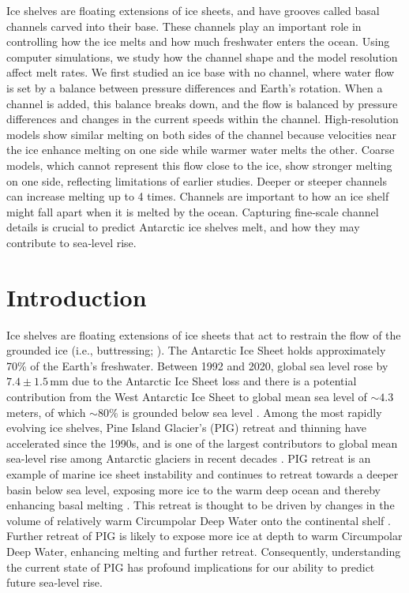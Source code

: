 \documentclass[draft]{agujournal2019}
\begin{document}
Ice shelves are floating extensions of ice sheets, and have grooves called basal channels carved into their base. These channels play an important role in controlling how the ice melts and how much freshwater enters the ocean. Using computer simulations, we study how the channel shape and the model resolution affect melt rates. We first studied an ice base with no channel, where water flow is set by a balance between pressure differences and Earth’s rotation. When a channel is added, this balance breaks down, and the flow is balanced by pressure differences and changes in the current speeds within the channel. High‑resolution models show similar melting on both sides of the channel because velocities near the ice enhance melting on one side while warmer water melts the other. Coarse models, which cannot represent this flow close to the ice, show stronger melting on one side, reflecting limitations of earlier studies. Deeper or steeper channels can increase melting up to 4 times. Channels are important to how an ice shelf might fall apart when it is melted by the ocean. Capturing fine‑scale channel details is crucial to predict  Antarctic ice shelves melt, and how they may contribute to sea‑level rise.


\section{Introduction}

Ice shelves are floating extensions of ice sheets that act to restrain the flow of the grounded ice (i.e., buttressing; \citealt{Dupont_iceshelf_2005}). The Antarctic Ice Sheet holds approximately 70\% of the Earth's freshwater. Between 1992 and 2020, global sea level rose by $7.4\pm1.5\,\mathrm{mm}$ due to the Antarctic Ice Sheet loss \citep{Otosoka_sheets_2023} and there is a potential contribution from the West Antarctic Ice Sheet to global mean sea level of $\sim4.3$ meters, of which $\sim80\%$ is grounded below sea level \citep{Fretwell_Bedmap2_2013}. Among the most rapidly evolving ice shelves, Pine Island Glacier's (PIG) retreat and thinning have accelerated since the 1990s, and is one of the largest contributors to global mean sea-level rise among Antarctic glaciers in recent decades \citep{Mouginot_Amundsen_2014, Rignot_Antarctic_2019, Joughin_PineIsland_2021}. PIG retreat is an example of marine ice sheet instability and continues to retreat towards a deeper basin below sea level, exposing more ice to the warm deep ocean and thereby enhancing basal melting \citep{Reed_PineIsland_2024}. This retreat is thought to be driven by changes in the volume of relatively warm Circumpolar Deep Water onto the continental shelf \citep{Dutrieux_PineIsland_2014}. Further retreat of PIG is likely to expose more ice at depth to warm Circumpolar Deep Water, enhancing melting and further retreat. Consequently, understanding the current state of PIG has profound implications for our ability to predict future sea-level rise.
\end{document}

